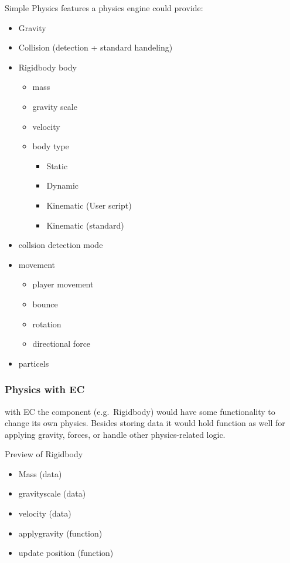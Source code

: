 \documentclass{projdoc}
\begin{document}
Simple Physics features a physics engine could provide:\noparbreak
\begin{itemize}
	\item Gravity
	\item Collision (detection + standard handeling)
	\item Rigidbody body\noparbreak
	\begin{itemize}
		\item mass
		\item gravity scale
		\item velocity
		\item body type\noparbreak
		\begin{itemize}
			\item Static
			\item Dynamic
			\item Kinematic (User script)
			\item Kinematic (standard)
		\end{itemize}
	\end{itemize}
	\item collsion detection mode
	\item movement\noparbreak
	\begin{itemize}
		\item player movement
		\item bounce
		\item rotation
		\item directional force
	\end{itemize}
	\item particels
\end{itemize}

\subsubsection{Physics with EC}

with EC the component (e.g.~Rigidbody) would have some functionality to change its
own physics. Besides storing data it would hold function as well for applying
gravity, forces, or handle other physics-related logic.

Preview of Rigidbody\noparbreak
\begin{itemize}
	\item Mass (data)
	\item gravityscale (data)
	\item velocity (data)
	\item applygravity (function)
	\item update position (function)
\end{itemize}
\end{document}
